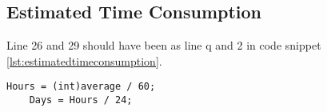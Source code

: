 \subsection*{Estimated Time Consumption}
Line 26 and 29 should have been as line q and 2 in code snippet \ref{lst:estimatedtimeconsumption}.
\begin{lstlisting}[style=sourceCode, caption=\myCaption{Corrected codesnippet}, label=lst:estimatedtimeconsumption,float=hp]
    Hours = (int)average / 60;
    Days = Hours / 24;
\end{lstlisting}

